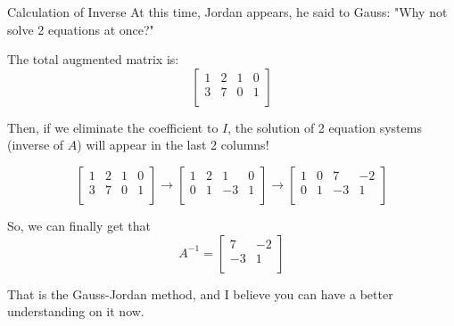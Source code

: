 \documentclass{beamer}
\begin{document}
\begin{frame}{Calculation of Inverse}
At this time, Jordan appears, he said to Gauss: "Why not solve 2 equations at once?"

\vspace{3pt}
The total augmented matrix is:
\begin{equation*}
    \left[ \begin{matrix}
        1&		2&		1&		0\\
        3&		7&		0&		1\\
    \end{matrix} \right]
\end{equation*}

Then, if we eliminate the coefficient to $I$, the solution of 2 equation systems (inverse of $A$) will appear in the last 2 columns!

\begin{equation*}
    \left[ \begin{matrix}
        1&		2&		1&		0\\
        3&		7&		0&		1\\
    \end{matrix} \right] \rightarrow \left[ \begin{matrix}
        1&		2&		1&		0\\
        0&		1&		-3&		1\\
    \end{matrix} \right] \rightarrow \left[ \begin{matrix}
        1&		0&		7&		-2\\
        0&		1&		-3&		1\\
    \end{matrix} \right]
\end{equation*}

So, we can finally get that
\begin{equation*}
    A^{-1}=\left[ \begin{matrix}
        7&		-2\\
        -3&		1\\
    \end{matrix} \right]
\end{equation*}

That is the Gauss-Jordan method, and I believe you can have a better understanding on it now.
\end{frame}
\end{document}
